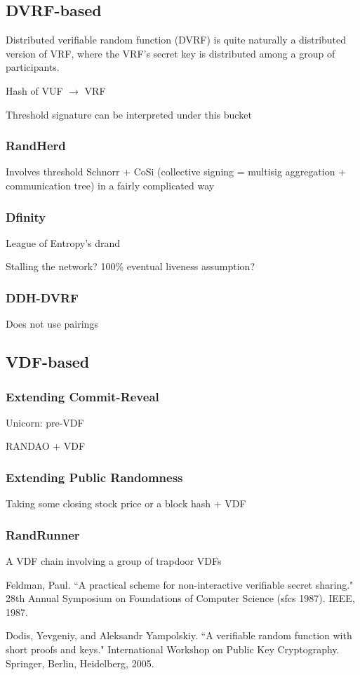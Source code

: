 \documentclass[11pt]{article}
\theoremstyle{definition}
\theoremstyle{remark}
\begin{document}
\subsection{DVRF-based}
Distributed verifiable random function (DVRF) is quite naturally a distributed version of VRF, where the VRF's secret key is distributed among a group of participants.

Hash of VUF $\rightarrow$ VRF

Threshold signature can be interpreted under this bucket

\subsubsection{RandHerd}
Involves threshold Schnorr + CoSi (collective signing = multisig aggregation + communication tree) in a fairly complicated way

\subsubsection{Dfinity}
League of Entropy's drand

Stalling the network? 100\% eventual liveness assumption?
\subsubsection{DDH-DVRF}
Does not use pairings

\subsection{VDF-based}
\subsubsection{Extending Commit-Reveal}
Unicorn: pre-VDF

RANDAO + VDF
\subsubsection{Extending Public Randomness}
Taking some closing stock price or a block hash + VDF
\subsubsection{RandRunner}
A VDF chain involving a group of trapdoor VDFs

\newpage
\begin{thebibliography}{20}
Feldman, Paul. ``A practical scheme for non-interactive verifiable secret sharing." 28th Annual Symposium on Foundations of Computer Science (sfcs 1987). IEEE, 1987.

Dodis, Yevgeniy, and Aleksandr Yampolskiy. ``A verifiable random function with short proofs and keys." International Workshop on Public Key Cryptography. Springer, Berlin, Heidelberg, 2005.
\end{thebibliography}
\end{document}
